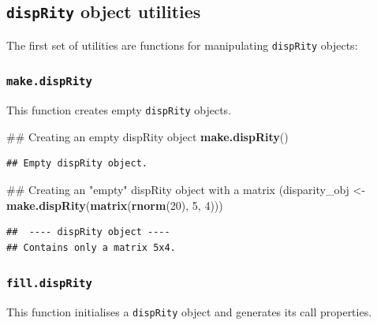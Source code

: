 \documentclass[]{book}
\newenvironment{Shaded}{\begin{snugshade}}{\end{snugshade}}
\newcommand{\KeywordTok}[1]{\textcolor[rgb]{0.13,0.29,0.53}{\textbf{#1}}}
\newcommand{\DecValTok}[1]{\textcolor[rgb]{0.00,0.00,0.81}{#1}}
\newcommand{\StringTok}[1]{\textcolor[rgb]{0.31,0.60,0.02}{#1}}
\newcommand{\OperatorTok}[1]{\textcolor[rgb]{0.81,0.36,0.00}{\textbf{#1}}}
\newcommand{\NormalTok}[1]{#1}
\theoremstyle{definition}
\theoremstyle{definition}
\theoremstyle{remark}
\begin{document}
\subsection{\texorpdfstring{\texttt{dispRity} object utilities
}{dispRity object utilities }}\label{disprity-object-utilities}

The first set of utilities are functions for manipulating
\texttt{dispRity} objects:

\subsubsection{\texorpdfstring{\texttt{make.dispRity}}{make.dispRity}}\label{make.disprity}

This function creates empty \texttt{dispRity} objects.

\begin{Shaded}
\begin{Highlighting}[]
\NormalTok{## Creating an empty dispRity object}
\KeywordTok{make.dispRity}\NormalTok{()}
\end{Highlighting}
\end{Shaded}

\begin{verbatim}
## Empty dispRity object.
\end{verbatim}

\begin{Shaded}
\begin{Highlighting}[]
\NormalTok{## Creating an "empty" dispRity object with a matrix}
\NormalTok{(disparity_obj <-}\StringTok{ }\KeywordTok{make.dispRity}\NormalTok{(}\KeywordTok{matrix}\NormalTok{(}\KeywordTok{rnorm}\NormalTok{(}\DecValTok{20}\NormalTok{), }\DecValTok{5}\NormalTok{, }\DecValTok{4}\NormalTok{)))}
\end{Highlighting}
\end{Shaded}

\begin{verbatim}
##  ---- dispRity object ---- 
## Contains only a matrix 5x4.
\end{verbatim}

\subsubsection{\texorpdfstring{\texttt{fill.dispRity}}{fill.dispRity}}\label{fill.disprity}

This function initialises a \texttt{dispRity} object and generates its
call properties.

\begin{Shaded}
\end{Shaded}
\end{document}
